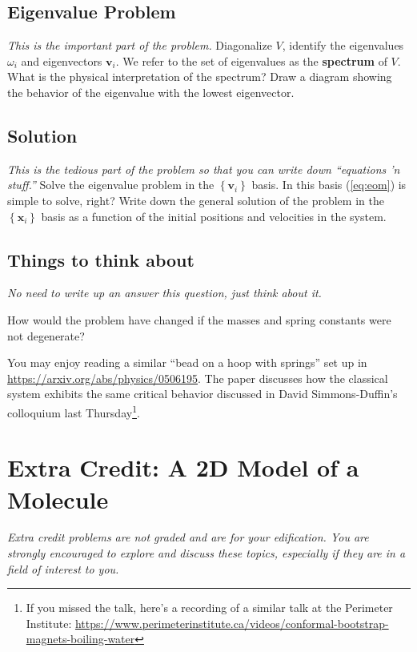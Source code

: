 \documentclass[12pt]{article}
\numberwithin{equation}{section}    %
\renewcommand{\vec}[1]{\mathbf{#1}} %
\begin{document}
\subsection{Eigenvalue Problem}

\emph{This is the important part of the problem.}
Diagonalize $V$, identify the eigenvalues $\omega_i$ and eigenvectors $\vec{v}_i$. We refer to the set of eigenvalues as the \textbf{spectrum} of $V$. What is the physical interpretation of the spectrum? Draw a diagram showing the behavior of the eigenvalue with the lowest eigenvector. 


\subsection{Solution}

\emph{This is the tedious part of the problem so that you can write down ``equations 'n stuff.''}
Solve the eigenvalue problem in the $\left\{ \vec{v}_i\right \}$ basis. In this basis (\ref{eq:eom}) is simple to solve, right? Write down the general solution of the problem in the $\left\{ \vec{x}_i\right \}$ basis as a function of the initial positions and velocities in the system. 


\subsection{Things to think about}

\emph{No need to write up an answer this question, just think about it.}

How would the problem have changed if the masses and spring constants were not degenerate? 

You may enjoy reading a similar ``bead on a hoop with springs'' set up in \url{https://arxiv.org/abs/physics/0506195}. The paper discusses how the classical system exhibits the same critical behavior discussed in David Simmons-Duffin's colloquium last Thursday\footnote{If you missed the talk, here's a recording of a similar talk at the Perimeter Institute: \url{https://www.perimeterinstitute.ca/videos/conformal-bootstrap-magnets-boiling-water}}.

\section*{Extra Credit: A 2D Model of a Molecule}

\emph{Extra credit problems are not graded and are for your edification. You are strongly encouraged to explore and discuss these topics, especially if they are in a field of interest to you.}
\end{document}
